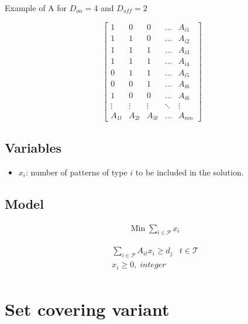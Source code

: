 \documentclass[a4paper,11pt]{article}
\begin{document}
    \vskip 0.3cm

    Example of A for $D_{on}=4$ and $D_{off}=2$

    $$
    \begin{bmatrix}
        1 & 0 & 0 & \dots  & A_{i1} \\
        1 & 1 & 0 & \dots  & A_{i2} \\
        1 & 1 & 1 & \dots  & A_{i3} \\
        1 & 1 & 1 & \dots  & A_{i4} \\
        0 & 1 & 1 & \dots  & A_{i5} \\
        0 & 0 & 1 & \dots  & A_{i6} \\
        1 & 0 & 0 & \dots  & A_{i6} \\
        \vdots & \vdots & \vdots & \ddots & \vdots \\
        A_{1t} & A_{2t} & A_{3t} & \dots  & A_{nm}
    \end{bmatrix}
    $$

    \subsection{Variables}

    \begin{itemize}
     \item $x_i$: number of patterns of type $i$ to be included in the solution.
    \end{itemize}

    \subsection{Model}

    \begin{align}
        & \text{Min}\; \sum_{i \in \mathcal{P}} x_i
    \end{align}

    \begin{align}
        & \sum_{i \in \mathcal{P}} A_{it}x_{i} \geq d_j & t \in \mathcal{T} \\
        & x_{i} \geq 0,\; integer \\
    \end{align}

\clearpage

\section{Set covering variant}
\end{document}
